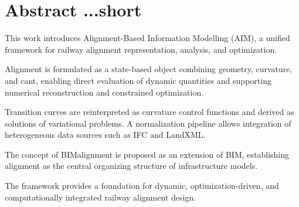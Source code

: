 \chapter*{Abstract ...short}


This work introduces Alignment-Based Information Modelling (AIM),
a unified framework for railway alignment representation, analysis,
and optimization.

Alignment is formulated as a state-based object combining geometry,
curvature, and cant, enabling direct evaluation of dynamic quantities
and supporting numerical reconstruction and constrained optimization.

Transition curves are reinterpreted as curvature control functions and
derived as solutions of variational problems.
A normalization pipeline allows integration of heterogeneous data
sources such as IFC and LandXML.

The concept of BIMalignment is proposed as an extension of BIM,
establishing alignment as the central organizing structure of
infrastructure models.

The framework provides a foundation for dynamic, optimization-driven,
and computationally integrated railway alignment design.
